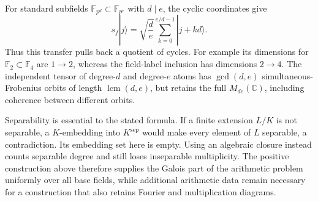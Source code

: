 For standard subfields $\mathbb F_{p^d}\subset\mathbb F_{p^e}$ with
$d\mid e$, the cyclic coordinates give
\[
 s_f|j\rangle=\sqrt{\frac de}
       \sum_{k=0}^{e/d-1}|j+kd\rangle.
\]
Thus this transfer pulls back a quotient of cycles. For example its
dimensions for $\mathbb F_2\subset\mathbb F_4$ are $1\to2$, whereas
the field-label inclusion has dimensions $2\to4$. The independent tensor
of degree-$d$ and degree-$e$ atoms has $\gcd(d,e)$ simultaneous-Frobenius
orbits of length $\operatorname{lcm}(d,e)$, but retains the full
$M_{de}(\mathbb C)$, including coherence between different orbits.

Separability is essential to the stated formula. If a finite extension
$L/K$ is not separable, a $K$-embedding into $K^{\mathrm{sep}}$ would make
every element of $L$ separable, a contradiction. Its embedding set here
is empty. Using an algebraic closure instead counts separable degree and
still loses inseparable multiplicity. The positive construction above
therefore supplies the Galois part of the arithmetic problem uniformly
over all base fields, while additional arithmetic data remain necessary
for a construction that also retains Fourier and multiplication diagrams.
